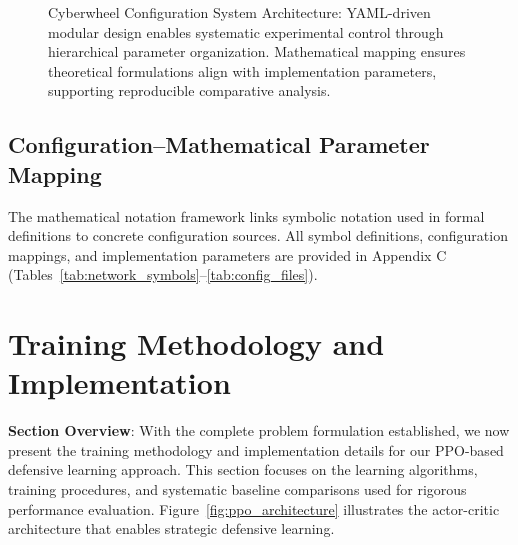 \documentclass[12pt,oneside]{article}
\begin{document}
\begin{figure}[H]
\caption{Cyberwheel Configuration System Architecture: YAML-driven modular design enables systematic experimental control through hierarchical parameter organization. Mathematical mapping ensures theoretical formulations align with implementation parameters, supporting reproducible comparative analysis.}
\end{figure}

\subsection{Configuration--Mathematical Parameter Mapping}

The mathematical notation framework links symbolic notation used in formal definitions to concrete configuration sources. All symbol definitions, configuration mappings, and implementation parameters are provided in Appendix C (Tables~\ref{tab:network_symbols}--\ref{tab:config_files}).


\clearpage

\section{Training Methodology and Implementation}

\textbf{Section Overview}: With the complete problem formulation established, we now present the training methodology and implementation details for our PPO-based defensive learning approach. This section focuses on the learning algorithms, training procedures, and systematic baseline comparisons used for rigorous performance evaluation. Figure~\ref{fig:ppo_architecture} illustrates the actor-critic architecture that enables strategic defensive learning.
\end{document}
